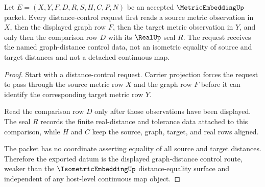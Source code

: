 \begin{theorem}
\label{thm:metric-embedding-graph-distance-control}
Let $E=(X,Y,F,D,R,S,H,C,P,N)$ be an accepted $\MetricEmbeddingUp$ packet. Every distance-control request first reads a source metric observation in $X$, then the displayed graph row $F$, then the target metric observation in $Y$, and only then the comparison row $D$ with its $\RealUp$ seal $R$. The request receives the named graph-distance control data, not an isometric equality of source and target distances and not a detached continuous map.
\end{theorem}
\begin{proof}
Start with a distance-control request. Carrier projection forces the request to pass through the source metric row $X$ and the graph row $F$ before it can identify the corresponding target metric row $Y$.

Read the comparison row $D$ only after those observations have been displayed. The seal $R$ records the finite real-distance and tolerance data attached to this comparison, while $H$ and $C$ keep the source, graph, target, and real rows aligned.

The packet has no coordinate asserting equality of all source and target distances. Therefore the exported datum is the displayed graph-distance control route, weaker than the $\IsometricEmbeddingUp$ distance-equality surface and independent of any host-level continuous map object.
\end{proof}

